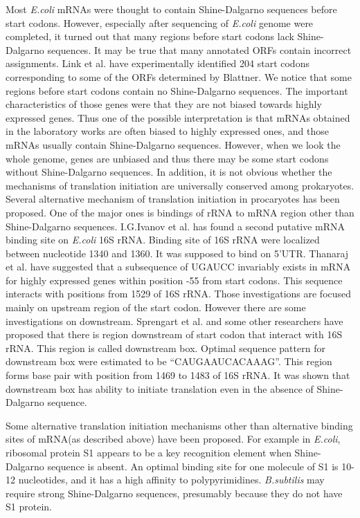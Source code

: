 Most {\it E.coli} mRNAs were thought to contain Shine-Dalgarno sequences
before start codons. However, especially after sequencing of {\it
E.coli} genome were completed\cite{label1065}, it turned out that many
regions before start codons lack Shine-Dalgarno sequences. It may be
true that many annotated ORFs contain incorrect
assignments\cite{label1005}.  Link et al.\cite{lts14} have
experimentally identified 204 start codons corresponding to some of the
ORFs determined by Blattner\cite{label1065}.  We notice that some
regions before start codons contain no Shine-Dalgarno sequences.  The
important characteristics of those genes were that they are not biased
towards highly expressed genes.  Thus one of the possible interpretation
is that mRNAs obtained in the laboratory works are often biased to
highly expressed ones, and those mRNAs usually contain Shine-Dalgarno
sequences.  However, when we look the whole genome, genes are unbiased
and thus there may be some start codons without Shine-Dalgarno
sequences. In addition, it is not obvious whether the mechanisms of
translation initiation are universally conserved among
prokaryotes\cite{label1005,label515}. Several alternative mechanism of
translation initiation in procaryotes has been proposed. One of the major
ones is bindings of rRNA to mRNA region other than Shine-Dalgarno
sequences. I.G.Ivanov et al.\cite{label23} has found a second putative
mRNA binding site on {\it E.coli} 16S rRNA. Binding site of 16S rRNA
were localized between nucleotide 1340 and 1360. It was supposed to bind
on 5'UTR. Thanaraj et al.\cite{label1091} have suggested that a
subsequence of UGAUCC invariably exists in mRNA for highly expressed
genes within position -55 from start codons. This sequence interacts
with positions from 1529 of 16S rRNA. Those investigations are focused
mainly on upstream region of the start codon. However there are some
investigations on downstream. Sprengart et al. and some other
researchers have proposed that there is region downstream of start codon
that interact with 16S rRNA\cite{label1501,label1101,ldbox3}. This
region is called downstream box. Optimal sequence pattern for downstream
box were estimated to be ``CAUGAAUCACAAAG''. This region forms base pair
with position from 1469 to 1483 of 16S rRNA. It was shown that
downstream box has ability to initiate translation even in the absence
of Shine-Dalgarno sequence.

Some alternative translation initiation mechanisms other than
alternative binding sites of mRNA(as described above) have been
proposed.  For example in {\it E.coli}, ribosomal protein S1 appears
to be a key recognition element when Shine-Dalgarno sequence is
absent\cite{lts11}. An optimal binding site for one molecule of S1 is
10-12 nucleotides, and it has a high affinity to polypyrimidines. {\it
B.subtilis} may require strong Shine-Dalgarno
sequences\cite{arclabel10}, presumably because they do not have S1
protein.

